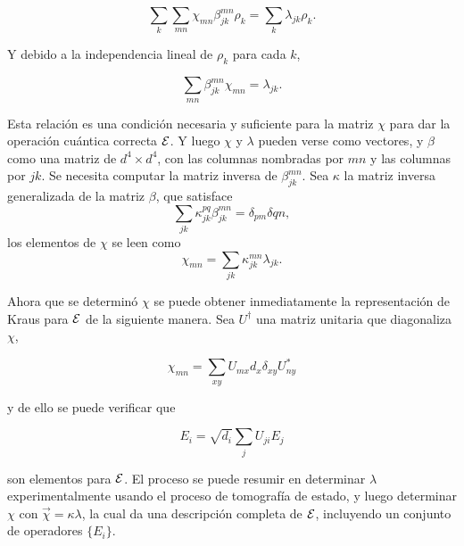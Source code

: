 \begin{equation}
\sum_k \sum_{mn}\chi_{mn}\beta_{jk}^{mn}\rho_k=\sum_k\lambda_{jk}\rho_k.
\end{equation}

Y debido a la independencia lineal de $\rho_k$ para cada $k$,

\begin{equation}
    \sum_{mn}\beta_{jk}^{mn}\chi_{mn}=\lambda_{jk}.
\end{equation}

Esta relación es una condición necesaria y suficiente para la matriz $\chi$ para dar la operación cuántica correcta $\mathcal{E}$. Y luego $\chi$ y $\lambda$ pueden verse como vectores, y $\beta$ como una matriz de $d^4\times d^4$, con las columnas nombradas por ${mn}$ y las columnas por ${jk}$. Se necesita computar la matriz inversa de $\beta_{jk}^{mn}$. Sea $\kappa$ la matriz inversa generalizada de la matriz $\beta$, que satisface \[\sum_{jk}\kappa_{jk}^{pq}\beta_{jk}^{mn}=\delta_{pm}\delta{qn},\] los elementos de $\chi$ se leen como 
\begin{equation}
    \chi_{mn}=\sum_{jk}\kappa_{jk}^{mn}\lambda_{jk}.
\end{equation}

Ahora que se determinó $\chi$ se puede obtener inmediatamente la representación de Kraus para $\mathcal{E}$ de la siguiente manera. Sea $U^\dagger$ una matriz unitaria que diagonaliza $\chi$,

\begin{equation}
    \chi_{mn}=\sum_{xy}U_{mx}d_x\delta_{xy}U_{ny}^*
\end{equation}

y de ello se puede verificar que 

\begin{equation}
    E_i=\sqrt{d_i} \sum_j U_{ji}E_j
\end{equation}


son elementos para $\mathcal{E}$. El proceso se puede resumir en determinar $\lambda$ experimentalmente usando el proceso de tomografía de estado, y luego determinar $\chi$ con $\vec{\chi}=\kappa\lambda$, la cual da una descripción completa de $\mathcal{E}$, incluyendo un conjunto de operadores $\{E_i\}$.








